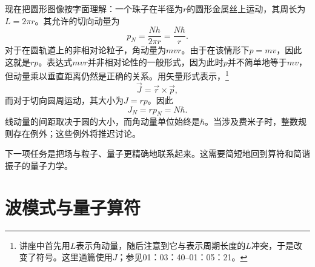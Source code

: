 \begin{classroomqa}
\end{classroomqa}

\begin{classroomqa}
\end{classroomqa}

\begin{classroomqa}
\end{classroomqa}

现在把圆形图像按字面理解：一个珠子在半径为\(r\)的圆形金属丝上运动，其周长为\(L=2\pi r\)。其允许的切向动量为
\begin{equation}
p_N=\frac{Nh}{2\pi r}=\frac{N\hbar}{r}.
\end{equation}
对于在圆轨道上的非相对论粒子，角动量为\(mvr\)。由于在该情形下\(p=mv\)，因此这就是\(rp\)。表达式\(mvr\)并非相对论性的一般形式，因为此时\(p\)并不简单地等于\(mv\)，但动量乘以垂直距离仍然是正确的关系。用矢量形式表示，\footnote{讲座中首先用\(L\)表示角动量，随后注意到它与表示周期长度的\(L\)冲突，于是改变了符号。这里通篇使用\(J\)；参见01：03：40--01：05：21。}
\begin{equation}
\vec J=\vec r\times\vec p,
\end{equation}
而对于切向圆周运动，其大小为\(J=rp\)。因此
\begin{equation}
J_N=rp_N=N\hbar.
\end{equation}
线动量的间距取决于圆的大小，而角动量单位始终是\(\hbar\)。当涉及费米子时，整数规则存在例外；这些例外将推迟讨论。

下一项任务是把场与粒子、量子更精确地联系起来。这需要简短地回到算符和简谐振子的量子力学。

\section{波模式与量子算符}

